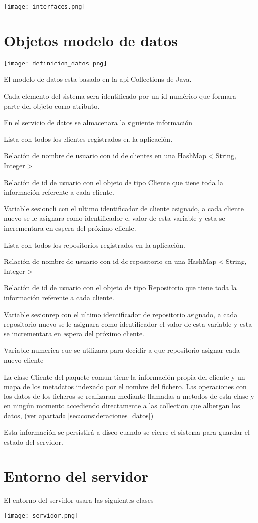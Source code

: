 \texttt{[image: interfaces.png]}

\section{Objetos modelo de datos}
\texttt{[image: definicion\_datos.png]}

El modelo de datos esta basado en la api Collections de Java.

Cada elemento del sistema sera identificado por un id numérico que formara parte del objeto como atributo.

En el servicio de datos se almacenara la siguiente información:
\begin{compactitem}
\item Lista con todos los clientes registrados en la aplicación.
\item Relación de nombre de usuario con id de clientes en una HashMap$<$String, Integer$>$
\item Relación de id de usuario con el objeto de tipo Cliente que tiene toda la información referente a cada cliente.
\item Variable sesioncli con el ultimo identificador de cliente asignado, a cada cliente nuevo se le asignara como identificador el valor de esta variable y esta se incrementara en espera del próximo cliente.
\item Lista con todos los repositorios registrados en la aplicación.
\item Relación de nombre de usuario con id de repositorio en una HashMap$<$String, Integer$>$
\item Relación de id de usuario con el objeto de tipo Repositorio que tiene toda la información referente a cada cliente.
\item Variable sesionrep con el ultimo identificador de repositorio asignado, a cada repositorio nuevo se le asignara como identificador el valor de esta variable y esta se incrementara en espera del próximo cliente.
\item Variable numerica que se utilizara para decidir a que repositorio asignar cada nuevo cliente
\end{compactitem}

La clase Cliente del paquete comun tiene la información propia del cliente y un mapa de los metadatos indexado por el nombre del fichero. Las operaciones con los datos de los ficheros se realizaran mediante llamadas a metodos de esta clase y en ningún momento accediendo directamente a las collection que albergan los datos, (ver apartado \ref{sec:consideraciones_datos})

Esta información se persistirá a disco cuando se cierre el sistema para guardar el estado del servidor.

\section{Entorno del servidor}

El entorno del servidor usara las siguientes clases

\centerline{\texttt{[image: servidor.png]}}

